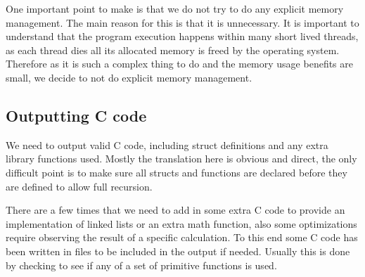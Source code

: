 \documentclass[a4paper]{article}
\begin{document}
One important point to make is that we do not try to do any explicit memory management. The main reason for this is that it is unnecessary. It is important to understand that the program execution happens within many short lived threads, as each thread dies all its allocated memory is freed by the operating system. Therefore as it is such a complex thing to do and the memory usage benefits are small, we decide to not do explicit memory management.




\subsection{Outputting C code}

We need to output valid C code, including struct definitions and any extra library functions used. Mostly the translation here is obvious and direct, the only difficult point is to make sure all structs and functions are declared before they are defined to allow full recursion.

There are a few times that we need to add in some extra C code to provide an implementation of linked lists or an extra math function, also some optimizations require observing the result of a specific calculation. To this end some C code has been written in files to be included in the output if needed. Usually this is done by checking to see if any of a set of primitive functions is used.



\end{document}

